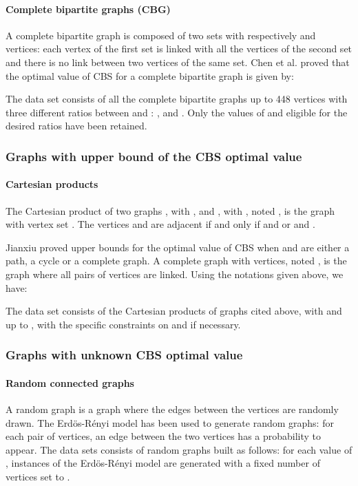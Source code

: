 \documentclass{scrartcl}
\theoremstyle{plain}
\newcommand{\cbs}{CBS}
\begin{document}
\paragraph{\textbf{Complete bipartite graphs (CBG)}}
A complete bipartite graph is  composed of two sets with respectively  and 
 vertices: each vertex of the first set is linked with all the vertices of 
the second set and there is no link between two vertices of 
the same set. Chen et al. \cite{Chen2007} proved that the optimal value of 
\cbs{} for a complete bipartite graph  is given by:

The data set consists of all the complete bipartite graphs up to 448 vertices 
with three different ratios between  and : ,  and . Only the 
values of  and  eligible for the desired ratios have been retained.

\subsubsection{Graphs with upper bound of the \cbs{} optimal value}


\paragraph{\textbf{Cartesian products}}
The Cartesian product of two graphs , with , and , with , noted , is the graph with vertex set 
. The vertices  
and  are adjacent if and only if  and  or  and .

Jianxiu \cite{Jianxiu2001} proved upper bounds for the optimal value of \cbs{} 
when  and  are either a path, a cycle or a complete graph. A complete 
graph with  vertices, noted , is the graph where all pairs of 
vertices are linked. Using the notations given above, we have:


The data set consists of the Cartesian products of graphs cited above, with  
and  up to , with the specific constraints on  and  if necessary.

\subsubsection{Graphs with unknown \cbs{} optimal value}

\paragraph{\textbf{Random connected graphs}}
A random graph \cite{Durrett2007} is a graph where the edges between the 
vertices are randomly drawn. The Erd\"os-R\'enyi model has been used to generate 
random graphs: for each pair of vertices, an edge between the two vertices has a 
probability  to appear. The data sets consists of  random graphs built 
as follows: for each value of ,  
instances of the Erd\"os-R\'enyi model are generated with a fixed number of 
vertices set to .
\end{document}
